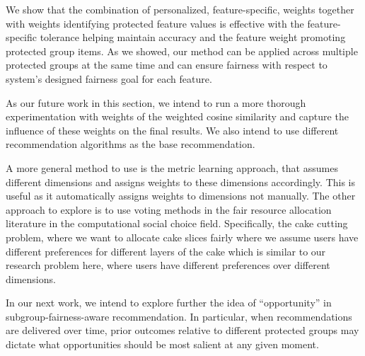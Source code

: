 We show that the combination of personalized, feature-specific, weights together with weights identifying protected feature values is effective with the feature-specific tolerance helping maintain accuracy and the feature weight promoting protected group items. As we showed, our method can be applied across multiple protected groups at the same time and can ensure fairness with respect to system's designed fairness goal for each feature.


As our future work in this section, we intend to run a more thorough experimentation with weights of the weighted cosine similarity and capture the influence of these weights on the final results. We also intend to use different recommendation algorithms as the base recommendation.

A more general method to use is the metric learning approach, that assumes different dimensions and assigns weights to these dimensions accordingly. This is useful as it automatically assigns weights to dimensions not manually.
The other approach to explore is to use voting methods in the fair resource allocation literature in the computational social choice field. Specifically, the cake cutting problem, where we want to allocate cake slices fairly where we assume users have different preferences for different layers of the cake which is similar to our research problem here, where users have different preferences over different dimensions.


In our next work, we intend to explore further the idea of ``opportunity'' in subgroup-fairness-aware recommendation. In particular, when recommendations are delivered over time, prior outcomes relative to different protected groups may dictate what opportunities should be most salient at any given moment. 

